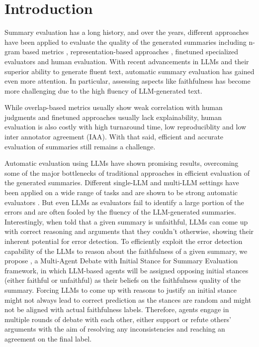 \section{Introduction}
Summary evaluation has a long history, and over the years, different approaches have been applied to evaluate the quality of the generated summaries including n-gram based metrics \cite{lin2004rouge,papineni2002bleu}, representation-based approaches \cite{zhang2020bertscoreevaluatingtextgeneration}, finetuned specialized evaluators \cite{kryscinski2020evaluating,fabbri2022qafacteval,goyal2020evaluating,clark2023seahorse,tang2024minicheck} and human evaluation. 
With recent advancements in LLMs and their superior ability to generate fluent text, automatic summary evaluation has gained even more attention. In particular, assessing aspects like faithfulness has become more challenging due to the high fluency of LLM-generated text. 

While overlap-based metrics usually show weak correlation with human judgments \cite{liu2023g,tang2024tofueval} and finetuned approaches usually lack explainability, human evaluation is also costly with high turnaround time, low reproduciblity and low inter annotator agreement (IAA). With that said, efficient and accurate evaluation of summaries still remains a challenge. 

Automatic evaluation using LLMs have shown promising results, overcoming some of the major bottlenecks of traditional approaches in efficient evaluation of the generated summaries.
Different single-LLM and multi-LLM settings have been applied on a wide range of tasks and are shown to be strong automatic evaluators \cite{liu2023g,luo2023chatgptfactualinconsistencyevaluator,wang2023factcheck,chan2023chateval,song2024finesure}. 
% 
But even LLMs as evaluators fail to identify a large portion of the errors and are often fooled by the fluency of the LLM-generated summaries. 
Interestingly, when told that a given summary is unfaithful, LLMs can come up with correct reasoning and arguments that they couldn't otherwise, showing their inherent potential for error detection.
To efficiently exploit the error detection capability of the LLMs to reason about the faithfulness of a given summary, we propose \textbf{\method}, a Multi-Agent Debate with Initial Stance for Summary Evaluation framework, in which LLM-based agents will be assigned opposing initial stances (either faithful or unfaithful) as their beliefs on the faithfulness quality of the summary. 
Forcing LLMs to come up with reasons to justify an initial stance might not always lead to correct prediction as the stances are random and might not be aligned with actual faithfulness labels.
Therefore, agents engage in multiple rounds of debate with each other, either support or refute others’ arguments with the aim of resolving any inconsistencies and reaching an agreement on the final label.

